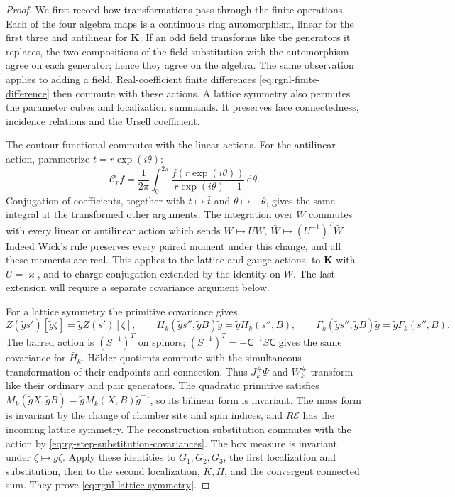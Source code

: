 \documentclass[11pt,letterpaper,reqno]{amsart}
\newcommand{\dd}{\mathrm d}
\begin{document}
\begin{proof}
We first record how transformations pass through the
finite operations. Each of the four algebra maps is a
continuous ring automorphism, linear for the first three
and antilinear for $\mathbf K$. If an odd field transforms
like the generators it replaces, the two compositions of
the field substitution with the automorphism agree on
each generator; hence they agree on the algebra.
The same observation applies to adding a field.
Real-coefficient finite differences
\eqref{eq:rgnl-finite-difference} then commute with these
actions. A lattice symmetry also permutes the parameter
cubes and localization summands. It preserves face
connectedness, incidence relations and the Ursell coefficient.

The contour functional commutes with the linear actions.
For the antilinear action, parametrize $t=r\exp(i\theta)$:
\[
 \mathcal C_rf=\frac1{2\pi}\int_0^{2\pi}
             \frac{f(r\exp(i\theta))}{r\exp(i\theta)-1}\,\dd\theta.
\]
Conjugation of coefficients, together with
$t\mapsto\bar t$ and $\theta\mapsto-\theta$, gives the
same integral at the transformed other arguments.
The integration over $W$ commutes with every linear or
antilinear action which sends
$W\mapsto UW$, $\bar W\mapsto(U^{-1})^T\bar W$.
Indeed Wick's rule preserves every paired moment under
this change, and all these moments are real.
This applies to the lattice and gauge actions, to
$\mathbf K$ with $U=\varkappa$, and to charge conjugation
extended by the identity on $W$.
The last extension will require a separate covariance
argument below.

For a lattice symmetry the primitive covariance gives
\[
 Z(\tilde gs')[\tilde g\zeta]=\tilde gZ(s')[\zeta],\qquad
 H_k(\tilde gs'',\tilde gB)\tilde g=\tilde gH_k(s'',B),
 \qquad
 \Gamma_k(\tilde gs'',\tilde gB)\tilde g=\tilde g\Gamma_k(s'',B).
\]
The barred action is $(S^{-1})^T$ on spinors;
$(S^{-1})^T=\pm\mathsf C^{-1}S\mathsf C$ gives the
same covariance for $\bar H_k$.
H\"older quotients commute with the simultaneous
transformation of their endpoints and connection.
Thus $J_k^\#\Psi$ and $W_k^\#$ transform like their
ordinary and pair generators.
The quadratic primitive satisfies
$M_k(\tilde gX,\tilde gB)=\tilde gM_k(X,B)\tilde g^{-1}$,
so its bilinear form is invariant.
The mass form is invariant by the change of chamber
site and spin indices, and $R\mathscr E$ has the
incoming lattice symmetry. The reconstruction substitution
commutes with the action by
\eqref{eq:rg-step-substitution-covariances}.
The box measure is invariant under $\zeta\mapsto\tilde g\zeta$.
Apply these identities to $G_1,G_2,G_3$, the first
localization and substitution, then to the second
localization, $K,H$, and the convergent connected sum.
They prove \eqref{eq:rgnl-lattice-symmetry}.


\end{proof}
\end{document}
